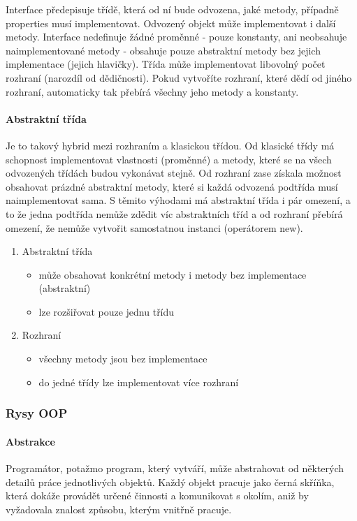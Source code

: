 \documentclass[10pt,a4paper]{article}
\begin{document}
Interface předepisuje třídě, která od ní bude odvozena, jaké metody, případně properties musí implementovat. Odvozený objekt může implementovat i další metody. Interface nedefinuje žádné proměnné - pouze konstanty, ani neobsahuje naimplementované metody - obsahuje pouze abstraktní metody bez jejich implementace (jejich hlavičky). Třída může implementovat libovolný počet rozhraní (narozdíl od dědičnosti). Pokud vytvoříte rozhraní, které dědí od jiného rozhraní, automaticky tak přebírá všechny jeho metody a konstanty.
\paragraph{Abstraktní třída}

Je to takový hybrid mezi rozhraním a klasickou třídou. Od klasické třídy má schopnost implementovat vlastnosti (proměnné) a metody, které se na všech odvozených třídách budou vykonávat stejně. Od rozhraní zase získala možnost obsahovat prázdné abstraktní metody, které si každá odvozená podtřída musí naimplementovat sama. S těmito výhodami má abstraktní třída i pár omezení, a to že jedna podtřída nemůže zdědit víc abstraktních tříd a od rozhraní přebírá omezení, že nemůže vytvořit samostatnou instanci (operátorem new).

\begin{enumerate}
\item Abstraktní třída
\begin{itemize}
\item může obsahovat konkrétní metody i metody bez implementace (abstraktní)
\item lze rozšiřovat pouze jednu třídu
\end{itemize}
\item Rozhraní
\begin{itemize}
\item všechny metody jsou bez implementace
\item do jedné třídy lze implementovat více rozhraní
\end{itemize}
\end{enumerate}
\subsubsection{Rysy OOP}
\paragraph{Abstrakce} Programátor, potažmo program, který vytváří, může abstrahovat od některých detailů práce jednotlivých objektů. Každý objekt pracuje jako černá skříňka, která dokáže provádět určené činnosti a komunikovat s okolím, aniž by vyžadovala znalost způsobu, kterým vnitřně pracuje.
\end{document}
